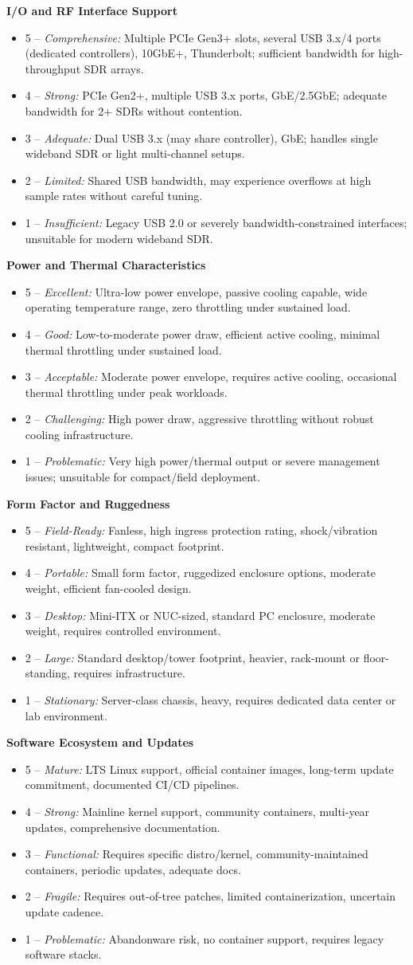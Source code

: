 \documentclass[11pt,a4paper]{article}
\newcommand{\criteriaheading}[1]{\par\smallskip\noindent\textbf{#1}\par}
\newcommand{\scoreitem}[3]{\item #1 -- \textit{#2:} #3}
\begin{document}
\criteriaheading{I/O and RF Interface Support}
\begin{itemize}
  \scoreitem{5}{Comprehensive}{Multiple PCIe Gen3+ slots, several USB 3.x/4 ports (dedicated controllers), 10GbE+, Thunderbolt; sufficient bandwidth for high-throughput SDR arrays.}
  \scoreitem{4}{Strong}{PCIe Gen2+, multiple USB 3.x ports, GbE/2.5GbE; adequate bandwidth for 2+ SDRs without contention.}
  \scoreitem{3}{Adequate}{Dual USB 3.x (may share controller), GbE; handles single wideband SDR or light multi-channel setups.}
  \scoreitem{2}{Limited}{Shared USB bandwidth, may experience overflows at high sample rates without careful tuning.}
  \scoreitem{1}{Insufficient}{Legacy USB 2.0 or severely bandwidth-constrained interfaces; unsuitable for modern wideband SDR.}
\end{itemize}

\criteriaheading{Power and Thermal Characteristics}
\begin{itemize}
  \scoreitem{5}{Excellent}{Ultra-low power envelope, passive cooling capable, wide operating temperature range, zero throttling under sustained load.}
  \scoreitem{4}{Good}{Low-to-moderate power draw, efficient active cooling, minimal thermal throttling under sustained load.}
  \scoreitem{3}{Acceptable}{Moderate power envelope, requires active cooling, occasional thermal throttling under peak workloads.}
  \scoreitem{2}{Challenging}{High power draw, aggressive throttling without robust cooling infrastructure.}
  \scoreitem{1}{Problematic}{Very high power/thermal output or severe management issues; unsuitable for compact/field deployment.}
\end{itemize}

\criteriaheading{Form Factor and Ruggedness}
\begin{itemize}
  \scoreitem{5}{Field-Ready}{Fanless, high ingress protection rating, shock/vibration resistant, lightweight, compact footprint.}
  \scoreitem{4}{Portable}{Small form factor, ruggedized enclosure options, moderate weight, efficient fan-cooled design.}
  \scoreitem{3}{Desktop}{Mini-ITX or NUC-sized, standard PC enclosure, moderate weight, requires controlled environment.}
  \scoreitem{2}{Large}{Standard desktop/tower footprint, heavier, rack-mount or floor-standing, requires infrastructure.}
  \scoreitem{1}{Stationary}{Server-class chassis, heavy, requires dedicated data center or lab environment.}
\end{itemize}

\criteriaheading{Software Ecosystem and Updates}
\begin{itemize}
  \scoreitem{5}{Mature}{LTS Linux support, official container images, long-term update commitment, documented CI/CD pipelines.}
  \scoreitem{4}{Strong}{Mainline kernel support, community containers, multi-year updates, comprehensive documentation.}
  \scoreitem{3}{Functional}{Requires specific distro/kernel, community-maintained containers, periodic updates, adequate docs.}
  \scoreitem{2}{Fragile}{Requires out-of-tree patches, limited containerization, uncertain update cadence.}
  \scoreitem{1}{Problematic}{Abandonware risk, no container support, requires legacy software stacks.}
\end{itemize}
\end{document}
